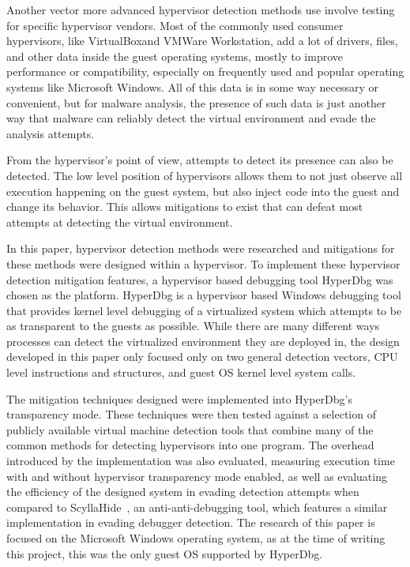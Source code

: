 Another vector more advanced hypervisor detection methods use involve testing for specific hypervisor vendors. Most of the commonly used consumer hypervisors, like VirtualBox\texttrademark and VMWare Workstation\texttrademark, 
add a lot of drivers, files, and other data inside the guest operating systems, mostly to improve performance or compatibility, especially on frequently used and popular operating systems like Microsoft Windows. 
All of this data is in some way necessary or convenient, but for malware analysis, the presence of such data is just another way that malware can reliably detect the virtual environment and evade the analysis attempts.

From the hypervisor's point of view, attempts to detect its presence can also be detected. The low level position of hypervisors allows them to not just observe all execution happening on the guest system, 
but also inject code into the guest and change its behavior. This allows mitigations to exist that can defeat most attempts at detecting the virtual environment.

In this paper, hypervisor detection methods were researched and mitigations for these methods were designed within a hypervisor. To implement these hypervisor detection mitigation features, 
a hypervisor based debugging tool HyperDbg was chosen as the platform. HyperDbg is a hypervisor based Windows debugging tool that provides kernel level debugging of a virtualized system which attempts to be as transparent to the guests as possible.
While there are many different ways processes can detect the virtualized environment they are deployed in, the design developed in this paper only focused only on two general detection vectors, 
CPU level instructions and structures, and guest OS kernel level system calls.

The mitigation techniques designed were implemented into HyperDbg's transparency mode. 
These techniques were then tested against a selection of publicly available virtual machine detection tools that combine many of the common methods for detecting hypervisors into one program. 
The overhead introduced by the implementation was also evaluated, measuring execution time with and without hypervisor transparency mode enabled, as well as evaluating the efficiency of the 
designed system in evading detection attempts when compared to ScyllaHide~\cite{scyllahide}, an anti-anti-debugging tool, which features a similar implementation in evading debugger detection.
The research of this paper is focused on the Microsoft Windows operating system, as at the time of writing this project, this was the only guest OS supported by HyperDbg.

